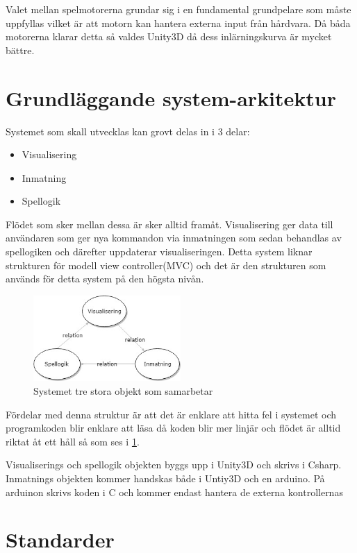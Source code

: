 \documentclass[a4paper,12pt,oneside,final]{extbook}
\begin{document}
 Valet mellan spelmotorerna grundar sig i en fundamental grundpelare som måste uppfyllas vilket är att motorn kan hantera externa input från hårdvara. Då båda motorerna klarar detta så valdes Unity3D då dess inlärningskurva är mycket bättre. 

\section{Grundläggande system-arkitektur}
Systemet som skall utvecklas kan grovt delas in i 3 delar:
\begin{itemize}
	\item Visualisering
	\item Inmatning
	\item Spellogik
\end{itemize}
Flödet som sker mellan dessa är sker alltid framåt. Visualisering ger data till användaren som ger nya kommandon via inmatningen som sedan behandlas av spellogiken och därefter uppdaterar visualiseringen. Detta system liknar strukturen för modell view controller(MVC)\cite{Design} och det är den strukturen som används för detta system på den högsta nivån. 



\begin{figure}[h]
	\includegraphics[width=0.5\textwidth, center]{System.jpg}
	\caption{Systemet tre stora objekt som samarbetar}
	\label{fig:System}
\end{figure}

Fördelar med denna struktur är att det är enklare att hitta fel i systemet och programkoden blir enklare att läsa då koden blir mer linjär och flödet är alltid riktat åt ett håll så som ses i \ref{fig:System}.

Visualiserings och spellogik objekten byggs upp i Unity3D och skrivs i Csharp. Inmatnings objekten kommer handskas både i Untiy3D och en arduino. På arduinon skrivs koden i C och kommer endast hantera de externa kontrollernas  

\section{Standarder}
\end{document}
